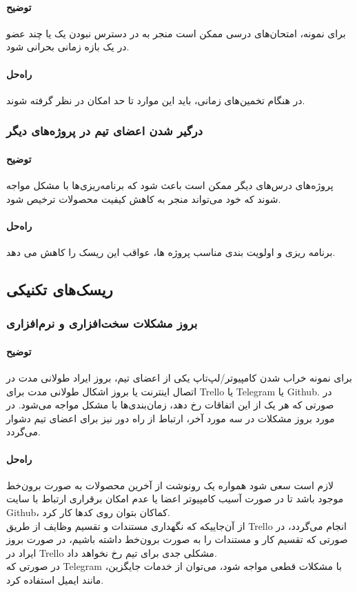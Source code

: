 \paragraph{توضیح}
برای نمونه، امتحان‌های درسی ممکن است منجر به در دسترس نبودن یک یا چند عضو در یک بازه زمانی بحرانی شود.
\paragraph{راه‌حل}
در هنگام تخمین‌های زمانی، باید این موارد تا حد امکان در نظر گرفته شوند.
\subsubsection{درگیر شدن اعضای تیم در پروژه‌های دیگر}
\paragraph{توضیح}
پروژه‌های درس‌های دیگر ممکن است باعث شود که برنامه‌ریزی‌ها با مشکل مواجه شوند که خود می‌تواند منجر به کاهش کیفیت محصولات ترخیص شود.
\paragraph{راه‌حل}
برنامه ریزی و اولویت بندی مناسب پروژه ها، عواقب این ریسک را کاهش می دهد.

\subsection{ریسک‌های تکنیکی}

\subsubsection{بروز مشکلات سخت‌افزاری و نرم‌افزاری}
\paragraph{توضیح}
برای نمونه خراب شدن کامپیوتر/لپ‌تاپ یکی از اعضای تیم، بروز ایراد طولانی مدت در اتصال اینترنت یا بروز اشکال طولانی مدت برای Trello یا Telegram یا Github. در صورتی که هر یک از این اتفاقات رخ دهد، زمان‌بندی‌ها با مشکل مواجه می‌شود. در مورد بروز مشکلات در سه مورد آخر، ارتباط  از راه دور نیز برای اعضای تیم دشوار می‌گردد.
\paragraph{راه‌حل}
لازم است سعی شود همواره یک رونوشت از آخرین محصولات به صورت برون‌خط موجود باشد تا در صورت آسیب کامپیوتر اعضا یا عدم امکان برقراری ارتباط با سایت Github، کماکان بتوان روی کدها کار کرد. \\
از آن‌جاییکه که نگهداری مستندات و تقسیم وظایف از طریق Trello انجام می‌گردد، در صورتی که تقسیم کار و مستندات را به صورت برون‌خط داشته باشیم، در صورت بروز ایراد در Trello مشکلی جدی برای تیم رخ نخواهد داد. \\
در صورتی که Telegram با مشکلات قطعی مواجه شود، می‌توان از خدمات جایگزین، مانند ایمیل استفاده کرد.
